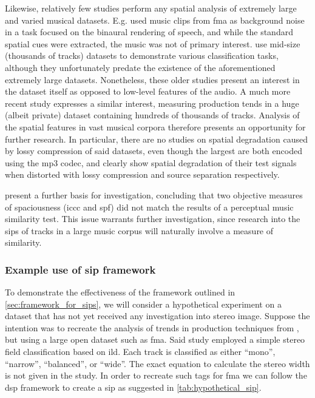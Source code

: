 \documentclass[referee,pdflatex,sn-mathphys-num]{sn-jnl}%
\newcommand{\q}[1]{\enquote{#1}}
\begin{document}
Likewise, relatively few studies perform any spatial analysis of extremely large and varied musical datasets. E.g. \cite{hsuModelMatchingPrincipleApplied2023} used music clips from \gls{fma}\cite{defferrardFMADatasetMusic2017} as background noise in a task focused on the binaural rendering of speech, and while the standard spatial cues were extracted, the music was not of primary interest. \cite{tzanetakisStereoPanningFeatures2007,tzanetakisStereoPanningInformation2010,tardieuProductionEffectAudio2011} use mid-size (thousands of tracks) datasets to demonstrate various classification tasks, although they unfortunately predate the existence of the aforementioned extremely large datasets. Nonetheless, these older studies present an interest in the dataset itself as opposed to low-level features of the audio. A much more recent study \cite{mourgelaExploringTrendsAudio2024} expresses a similar interest, measuring production tends in a huge (albeit private) dataset containing hundreds of thousands of tracks. Analysis of the spatial features in vast musical corpora therefore presents an opportunity for further research. In particular, there are no studies on spatial degradation caused by lossy compression of said datasets, even though the largest \cite{defferrardFMADatasetMusic2017,bogdanovMTGJamendoDatasetAutomatic2019} are both encoded using the \gls{mp3} codec, and \cite{barryBinaspectPythonLibrary2025,giampiccoloModelingImpulseResponse2025} clearly show spatial degradation of their test signals when distorted with lossy compression and source separation respectively.

\cite{ziemerUsingPsychoacousticModels2016,wilsonPerceptionAudioQuality2016} present a further basis for investigation, concluding that two objective measures of spaciousness (\gls{iccc} and \gls{spf}) did not match the results of a perceptual music similarity test. This issue warrants further investigation, since research into the \glspl{sip} of tracks in a large music corpus will naturally involve a measure of similarity.

\subsubsection{Example use of \gls{sip} framework}
To demonstrate the effectiveness of the framework outlined in \cref{sec:framework_for_sips}, we will consider a hypothetical experiment on a dataset that has not yet received any investigation into stereo image. Suppose the intention was to recreate the analysis of trends in production techniques from \cite{mourgelaExploringTrendsAudio2024}, but using a large open dataset such as \gls{fma}. Said study employed a simple stereo field classification based on \gls{ild}. Each track is classified as either \q{mono}, \q{narrow}, \q{balanced}, or \q{wide}. The exact equation to calculate the stereo width is not given in the study. In order to recreate such tags for \gls{fma} we can follow the \gls{dsp} framework to create a \gls{sip} as suggested in \cref{tab:hypothetical_sip}.
\end{document}
